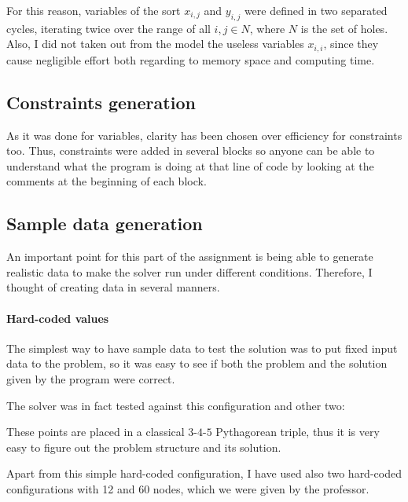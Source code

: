 For this reason, variables of the sort $x_{i,j}$ and $y_{i,j}$ were defined in
two separated cycles, iterating twice over the range of all $i,j\in{N}$, where
$N$ is the set of holes. Also, I did not taken out from the model the useless
variables $x_{i,i}$, since they cause negligible effort both regarding to
memory space and computing time.

\subsection{Constraints generation}
As it was done for variables, clarity has been chosen over efficiency for
constraints too. Thus, constraints were added in several blocks so anyone can
be able to understand what the program is doing at that line of code by looking
at the comments at the beginning of each block.

\subsection{Sample data generation}
An important point for this part of the assignment is being able to generate
realistic data to make the solver run under different conditions.
Therefore, I thought of creating data in several manners.

\paragraph{Hard-coded values} The simplest way to have sample data to test the
solution was to put fixed input data to the problem, so it was easy to see if
both the problem and the solution given by the program were correct.

The solver was in fact tested against this configuration and other two:

\begin{figure}[h!]
\centering
{}
\end{figure}

These points are placed in a classical $3$-$4$-$5$ Pythagorean triple, thus it
is very easy to figure out the problem structure and its solution.

Apart from this simple hard-coded configuration, I have used also two hard-coded
configurations with 12 and 60 nodes, which we were given by the professor.

